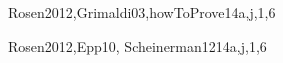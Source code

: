 \begin{syllabus}
\begin{unit}{\DSBasicLogic}{}{Rosen2012,Grimaldi03,howToProve}{14}{a,j,1,6}
   \begin{topics}
        \item \DSBasicLogicTopicPropositional%
        \item \DSBasicLogicTopicLogical%
        \item \DSBasicLogicTopicTruth%
        \item \DSBasicLogicTopicNormal%
        \item \DSBasicLogicTopicValidity%
        \item \DSBasicLogicTopicPropositionalInference%
        \item \DSBasicLogicTopicPredicate%
        \item \DSBasicLogicTopicLimitations%
   \end{topics}
   \begin{learningoutcomes}
	\item \DSBasicLogicLOConvertLogical [\Usage ]
	\item \DSBasicLogicLOApplyFormal [\Usage ]
	\item \DSBasicLogicLOUseThe [\Usage]
	\item \DSBasicLogicLODescribeHowCan [\Familiarity]
	\item \DSBasicLogicLOApplyFormalAnd [\Usage ]
	\item \DSBasicLogicLODescribeTheLimitationsAnd [\Usage]
   \end{learningoutcomes}
 \end{unit}

\begin{unit}{\DSProofTechniques}{}{Rosen2012,Epp10, Scheinerman12}{14}{a,j,1,6}
\begin{topics}
        \item \DSProofTechniquesTopicNotions%
        \item \DSProofTechniquesTopicThe%
        \item \DSProofTechniquesTopicDirect%
        \item \DSProofTechniquesTopicDisproving%
        \item \DSProofTechniquesTopicProof%
        \item \DSProofTechniquesTopicInduction%
        \item \DSProofTechniquesTopicStructural%
        \item \DSProofTechniquesTopicWeak%
        \item \DSProofTechniquesTopicRecursive%
        \item \DSProofTechniquesTopicWell%
\end{topics}


\end{unit}
\end{syllabus}
